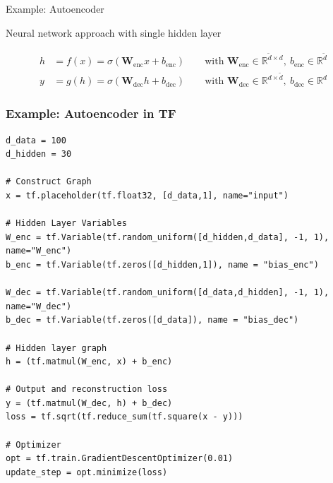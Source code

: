 \documentclass[mathserif]{beamer}
\begin{document}
\begin{frame}{Example: Autoencoder}
\begin{block}{Neural network approach with single hidden layer}
\begin{figure}
		\end{figure}
		\vspace{-0.5cm}
		\begin{align*}
			h &= f(x)=\sigma\left(\mathbf W_\text{enc}x + b_\text{enc}\right)\qquad\text{with $\mathbf W_\text{enc}\in\mathbb R^{\tilde d\times d},\ b_\text{enc}\in\mathbb R^{\tilde d}$}\\
			y &= g(h)=\sigma\left(\mathbf W_\text{dec}h + b_\text{dec}\right)\qquad\text{with $\mathbf W_\text{dec}\in\mathbb R^{d\times\tilde d},\ b_\text{dec}\in\mathbb R^d$}
		\end{align*}
	\end{block}
\end{frame}

\begin{frame}[fragile]
	\frametitle{Example: Autoencoder in TF}
	\begin{verbatim}
d_data = 100        
d_hidden = 30   

# Construct Graph
x = tf.placeholder(tf.float32, [d_data,1], name="input")
  
# Hidden Layer Variables
W_enc = tf.Variable(tf.random_uniform([d_hidden,d_data], -1, 1), name="W_enc")
b_enc = tf.Variable(tf.zeros([d_hidden,1]), name = "bias_enc")
  
W_dec = tf.Variable(tf.random_uniform([d_data,d_hidden], -1, 1), name="W_dec")
b_dec = tf.Variable(tf.zeros([d_data]), name = "bias_dec")
  
# Hidden layer graph
h = (tf.matmul(W_enc, x) + b_enc)

# Output and reconstruction loss
y = (tf.matmul(W_dec, h) + b_dec)
loss = tf.sqrt(tf.reduce_sum(tf.square(x - y)))
  
# Optimizer 
opt = tf.train.GradientDescentOptimizer(0.01)
update_step = opt.minimize(loss)
\end{verbatim}
\end{frame}
\end{document}
